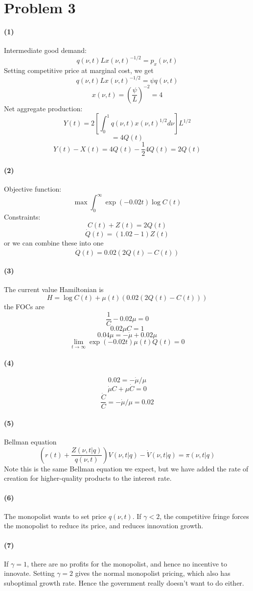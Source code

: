 \documentclass[10pt,letter]{article}
\newcommand{\problem}[1]{\section*{Problem #1}}
\newcommand{\problempart}[1]{\paragraph{#1}}
\begin{document}
\problem{3}
\problempart{(1)}
Intermediate good demand:
\[ q(\nu, t) L x(\nu, t)^{-1/2} = p_x(\nu, t) \]
Setting competitive price at marginal cost, we get
\[  q(\nu, t) L x(\nu, t)^{-1/2} = \psi q(\nu, t) \]
\[ x(\nu, t) = \left(\frac{\psi}{L} \right)^{-2} = 4\]
Net aggregate production:
\[ Y(t) = 2 \left[ \int_0^1 q(\nu, t) x(\nu, t)^{1/2} d\nu \right]L^{1/2} \]
\[ = 4 Q(t) \]
\[ Y(t) - X(t) = 4Q(t) - \frac{1}{2}4Q(t) = 2Q(t) \]
\problempart{(2)}
Objective function:
\[ \max \int_0^\infty \exp(-0.02 t)\log C(t) \]
Constraints:
\[ C(t) + Z(t) = 2Q(t) \]
\[ \dot{Q}(t) = (1.02 - 1)Z(t) \]
or we can combine these into one
\[ \dot{Q}(t) = 0.02 (2 Q(t) - C(t))\]
\problempart{(3)}
The current value Hamiltonian is
\[ H = \log C(t) + \mu(t)(0.02(2Q(t) - C(t))) \]
the FOCs are
\[ \frac{1}{C} - 0.02 \mu = 0 \]
\[ 0.02 \mu C = 1 \]
\[ 0.04 \mu = - \dot{\mu} + 0.02 \mu \]
\[ \lim_{t \to \infty} \exp(-0.02t)\mu(t)Q(t) = 0 \]

\problempart{(4)}
\[ 0.02 = - \dot{\mu}/\mu \]
\[ \dot{\mu} C + \mu \dot{C} = 0 \]
\[ \frac{\dot{C}}{C} = - \dot{\mu}/\mu = 0.02 \]
\problempart{(5)}
Bellman equation
\[\left( r(t) + \frac{Z(\nu, t|q)}{q(\nu, t)} \right) V(\nu, t | q) - \dot{V}(\nu, t | q)= \pi(\nu, t | q)   \]
Note this is the same Bellman equation we expect, but we have added the rate of creation for higher-quality products to the interest rate.
\problempart{(6)}
The monopolist wants to set price $q(\nu, t)$. If $\gamma < 2$, the competitive fringe forces the monopolist to reduce its price, and reduces innovation growth.
\problempart{(7)}
If $\gamma = 1$, there are no profits for the monopolist, and hence no incentive to innovate. Setting $\gamma = 2$ gives the normal monopolist pricing, which also has suboptimal growth rate. Hence the government really doesn't want to do either.
\end{document}
